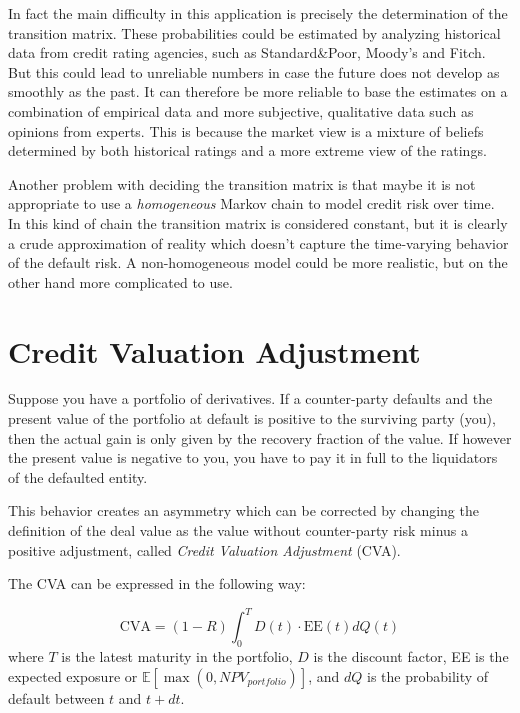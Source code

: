 In fact the main difficulty in this application is precisely the determination of the transition matrix. These probabilities could be estimated by analyzing historical data from credit rating agencies, such as Standard\&Poor, Moody's and Fitch. But this could lead to unreliable numbers in case the future does not develop as smoothly as the past. It can therefore be more reliable to base the estimates on a combination of empirical data and more subjective, qualitative data such as opinions from experts. This is because the market view is a mixture of beliefs determined by both historical ratings and a more extreme view of the ratings. 

Another problem with deciding the transition matrix is that maybe it is not appropriate to use a \emph{homogeneous} Markov chain to model credit risk over time. In this kind of chain the transition matrix is considered constant, but it is clearly a crude approximation of reality which doesn't capture the time-varying behavior of the default risk. A non-homogeneous model could be more realistic, but on the other hand more complicated to use. 

\section{Credit Valuation Adjustment}
\label{credit-valuation-adjustment}

Suppose you have a portfolio of derivatives. If a counter-party defaults and the present value of the portfolio at default is positive to the surviving party (you), then the actual gain is only given by the recovery fraction of the value. If however the present value is negative to you, you have to pay it in full to the liquidators of the defaulted entity.

This behavior creates an asymmetry which can be corrected by changing the definition of the deal value as the value without counter-party risk minus a positive adjustment, called \emph{Credit Valuation Adjustment} (CVA).

The CVA can be expressed in the following way:

\begin{equation}
\text{CVA} = (1-R) \int_0^T D(t) \cdot \textrm{EE}(t) dQ(t)
\label{eq:cva}
\end{equation}
where $T$ is the latest maturity in the portfolio, $D$ is the discount factor, EE is the expected exposure or $\mathbb{E}[\max(0, NPV_{portfolio})]$, and $dQ$ is the probability of default between $t$ and $t+dt$.


